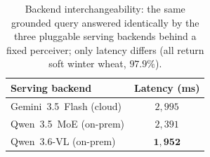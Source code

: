 \begin{table}[htbp]
\caption{Backend interchangeability: the same grounded query answered identically
by the three pluggable serving backends behind a fixed perceiver; only latency
differs (all return soft winter wheat, $97.9\%$).}
\label{tab:backend-switch}
\centering
\begin{tabular}{lc}
\toprule
\textbf{Serving backend} & \textbf{Latency (ms)} \\
\midrule
Gemini~3.5~Flash (cloud)      & $2{,}995$ \\
Qwen~3.5~MoE (on-prem)        & $2{,}391$ \\
Qwen~3.6-VL (on-prem)         & $\mathbf{1{,}952}$ \\
\bottomrule
\end{tabular}
\end{table}
